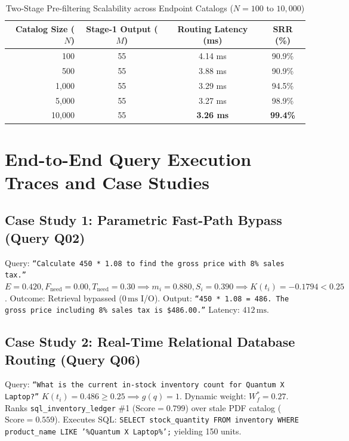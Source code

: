 \documentclass[journal,10pt,twocolumn]{IEEEtran}
\begin{document}
\begin{table}[t]
\centering
\caption{Two-Stage Pre-filtering Scalability across Endpoint Catalogs ($N = 100$ to $10{,}000$)}
\label{tab:scalability_measured}
\begin{tabular}{rccc}
\toprule
\textbf{Catalog Size ($N$)} & \textbf{Stage-1 Output ($M$)} & \textbf{Routing Latency (ms)} & \textbf{SRR (\%)} \\
\midrule
100    & 55 & 4.14 ms & 90.9\% \\
500    & 55 & 3.88 ms & 90.9\% \\
1,000  & 55 & 3.29 ms & 94.5\% \\
5,000  & 55 & 3.27 ms & 98.9\% \\
10,000 & 55 & \textbf{3.26 ms} & \textbf{99.4\%} \\
\bottomrule
\end{tabular}
\end{table}

\section{End-to-End Query Execution Traces and Case Studies}
\label{sec:case_studies}

\subsection{Case Study 1: Parametric Fast-Path Bypass (Query Q02)}
Query: \texttt{``Calculate 450 * 1.08 to find the gross price with 8\% sales tax.''}  
$E = 0.420, F_{\text{need}} = 0.00, T_{\text{need}} = 0.30 \implies m_i = 0.880, S_i = 0.390 \implies K(t_i) = -0.1794 < 0.25$.  
Outcome: Retrieval bypassed ($0\,\text{ms}$ I/O). Output: \texttt{``450 * 1.08 = 486. The gross price including 8\% sales tax is \$486.00.''} Latency: $412\,\text{ms}$.

\subsection{Case Study 2: Real-Time Relational Database Routing (Query Q06)}
Query: \texttt{``What is the current in-stock inventory count for Quantum X Laptop?''}  
$K(t_i) = 0.486 \ge 0.25 \implies g(q) = 1$. Dynamic weight: $W_f^* = 0.27$. Ranks \texttt{sql\_inventory\_ledger} \#1 ($\text{Score} = 0.799$) over stale PDF catalog ($\text{Score} = 0.559$). Executes SQL: \texttt{SELECT stock\_quantity FROM inventory WHERE product\_name LIKE '\%Quantum X Laptop\%';} yielding 150 units.
\end{document}
